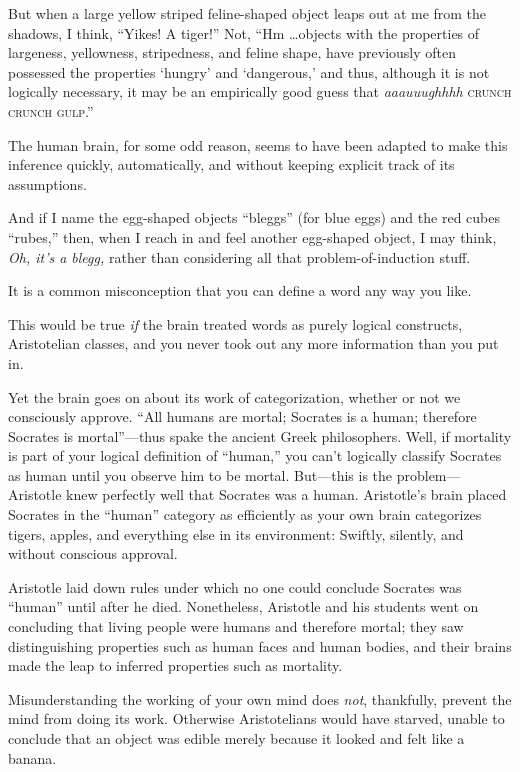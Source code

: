 {
 But when a large yellow striped feline-shaped object leaps out at
me from the shadows, I think, ``Yikes! A
tiger!'' Not, ``Hm \ldots objects
with the properties of largeness, yellowness, stripedness, and feline
shape, have previously often possessed the properties
`hungry' and
`dangerous,' and thus, although it is
not logically necessary, it may be an empirically good guess that
\textit{aaauuughhhh} \textsc{crunch crunch gulp}.''}

{
 The human brain, for some odd reason, seems to have been adapted
to make this inference quickly, automatically, and without keeping
explicit track of its assumptions.}

{
 And if I name the egg-shaped objects
``bleggs'' (for blue eggs) and the
red cubes ``rubes,'' then, when I
reach in and feel another egg-shaped object, I may think, \textit{Oh,
it's a blegg,} rather than considering all that
problem-of-induction stuff.}

{
 It is a common misconception that you can define a word any way
you like.}

{
 This would be true \textit{if} the brain treated words as purely
logical constructs, Aristotelian classes, and you never took out any
more information than you put in.}

{
 Yet the brain goes on about its work of categorization, whether or
not we consciously approve. ``All humans are mortal;
Socrates is a human; therefore Socrates is
mortal''---thus spake the ancient Greek philosophers.
Well, if mortality is part of your logical definition of
``human,'' you can't
logically classify Socrates as human until you observe him to be
mortal. But---this is the problem---Aristotle knew perfectly well that
Socrates was a human. Aristotle's brain placed Socrates
in the ``human'' category as
efficiently as your own brain categorizes tigers, apples, and
everything else in its environment: Swiftly, silently, and without
conscious approval.}

{
 Aristotle laid down rules under which no one could conclude
Socrates was ``human'' until after
he died. Nonetheless, Aristotle and his students went on concluding
that living people were humans and therefore mortal; they saw
distinguishing properties such as human faces and human bodies, and
their brains made the leap to inferred properties such as mortality.}

{
 Misunderstanding the working of your own mind does \textit{not},
thankfully, prevent the mind from doing its work. Otherwise
Aristotelians would have starved, unable to conclude that an object was
edible merely because it looked and felt like a banana.}

